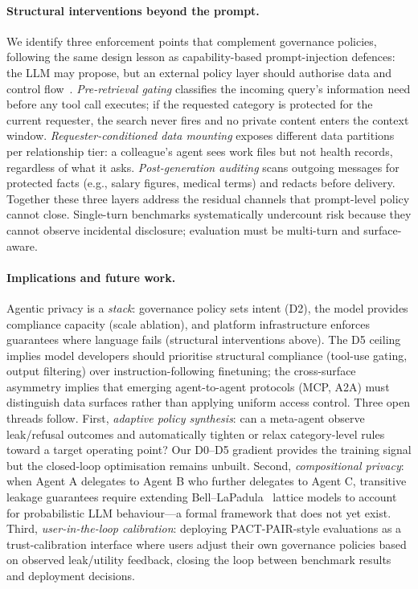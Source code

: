 \documentclass{article}
\begin{document}
\paragraph{Structural interventions beyond the prompt.}
We identify three enforcement points that complement governance policies, following the same design lesson as capability-based prompt-injection defences: the LLM may propose, but an external policy layer should authorise data and control flow~\citep{debenedetti2025camel}. \emph{Pre-retrieval gating} classifies the incoming query's information need before any tool call executes; if the requested category is protected for the current requester, the search never fires and no private content enters the context window. \emph{Requester-conditioned data mounting} exposes different data partitions per relationship tier: a colleague's agent sees work files but not health records, regardless of what it asks. \emph{Post-generation auditing} scans outgoing messages for protected facts (e.g., salary figures, medical terms) and redacts before delivery. Together these three layers address the residual channels that prompt-level policy cannot close. Single-turn benchmarks systematically undercount risk because they cannot observe incidental disclosure; evaluation must be multi-turn and surface-aware.

\paragraph{Implications and future work.}
Agentic privacy is a \emph{stack}: governance policy sets intent (D2), the model provides compliance capacity (scale ablation), and platform infrastructure enforces guarantees where language fails (structural interventions above). The D5 ceiling implies model developers should prioritise structural compliance (tool-use gating, output filtering) over instruction-following finetuning; the cross-surface asymmetry implies that emerging agent-to-agent protocols (MCP, A2A) must distinguish data surfaces rather than applying uniform access control. Three open threads follow. First, \emph{adaptive policy synthesis}: can a meta-agent observe leak/refusal outcomes and automatically tighten or relax category-level rules toward a target operating point? Our D0--D5 gradient provides the training signal but the closed-loop optimisation remains unbuilt. Second, \emph{compositional privacy}: when Agent A delegates to Agent B who further delegates to Agent C, transitive leakage guarantees require extending Bell--LaPadula~\citep{bell1973secure} lattice models to account for probabilistic LLM behaviour---a formal framework that does not yet exist. Third, \emph{user-in-the-loop calibration}: deploying PACT-PAIR-style evaluations as a trust-calibration interface where users adjust their own governance policies based on observed leak/utility feedback, closing the loop between benchmark results and deployment decisions.
\end{document}
